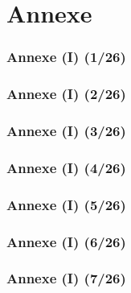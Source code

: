 \documentclass{beamer}
\begin{document}
\section{Annexe}
{
\begin{frame}
\frametitle{Annexe (I) (1/26)}



\end{frame}

\begin{frame}
\frametitle{Annexe (I) (2/26)}



\end{frame}

\begin{frame}
\frametitle{Annexe (I) (3/26)}



\end{frame}

\begin{frame}
\frametitle{Annexe (I) (4/26)}



\end{frame}

\begin{frame}
\frametitle{Annexe (I) (5/26)}



\end{frame}

\begin{frame}
\frametitle{Annexe (I) (6/26)}



\end{frame}

\begin{frame}
\frametitle{Annexe (I) (7/26)}



\end{frame}

}
\end{document}
